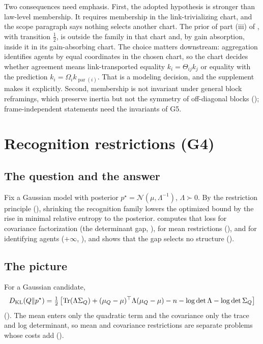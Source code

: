 Two consequences need emphasis. First, the adopted hypothesis is stronger than law-level membership. It
requires membership in the link-trivializing chart, and the scope paragraph says nothing selects another
chart. The prior of part (iii) of , with transition
\(\tfrac12\), is outside the family in that chart and, by gain absorption, inside it in its gain-absorbing
chart. The choice matters downstream: aggregation identifies agents by equal coordinates in the chosen
chart, so the chart decides whether agreement means link-transported equality \(k_i=\Theta_{ij}k_j\) or
equality with the prediction \(k_i=\Omega_ik_{\operatorname{par}(i)}\). That is a modeling decision, and
the supplement makes it explicitly. Second, membership is not invariant under general block reframings,
which preserve inertia but not the symmetry of off-diagonal blocks
(); frame-independent statements need the invariants of G5.

\section{Recognition restrictions (G4)}
\label{comp:sg1-restrictions}

\subsection{The question and the answer}

Fix a Gaussian model with posterior \(p^\star=\mathcal N(\mu,\Lambda^{-1})\), \(\Lambda\succ0\). By the
restriction principle (), shrinking the recognition family lowers the
optimized bound by the rise in minimal relative entropy to the posterior.  computes
that loss for covariance factorization (the determinant gap, ), for mean
restrictions (), and for identifying agents (\(+\infty\),
), and shows that the gap selects no structure
().

\subsection{The picture}

For a Gaussian candidate,
\[
D_{\mathrm{KL}}(Q\Vert p^\star)=\tfrac12\left[\operatorname{Tr}(\Lambda\Sigma_Q)+(\mu_Q-\mu)^\top\Lambda(\mu_Q-\mu)-n-\log\det\Lambda-\log\det\Sigma_Q\right]
\]
(). The mean enters only the quadratic term and the covariance only
the trace and log determinant, so mean and covariance restrictions are separate problems whose costs add
().


